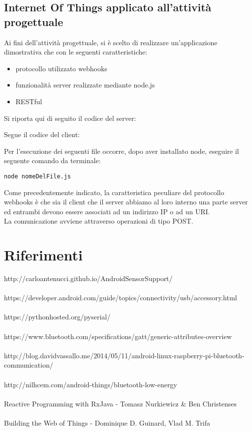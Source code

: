 \documentclass{article}
\begin{document}
\subsection{Internet Of Things applicato all'attività progettuale}
Ai fini dell'attività progettuale, si è scelto di realizzare un'applicazione dimostrativa che con le seguenti caratteristiche:
\begin{itemize}
    \item protocollo utilizzato webhooks
    \item funzionalità server realizzate mediante node.js
    \item RESTful
\end{itemize}
Si riporta qui di seguito il codice del server:

Segue il codice del client:

Per l'esecuzione dei seguenti file occorre, dopo aver installato node, eseguire il seguente comando da terminale:
\begin{lstlisting}
node nomeDelFile.js
\end{lstlisting}
Come precedentemente indicato, la caratteristica peculiare del protocollo webhooks è che sia il client che il server abbiamo al loro interno una parte server ed entrambi devono essere associati ad un indirizzo IP o ad un URI.\\
La comunicazione avviene attraverso operazioni di tipo POST. 
\newpage
\section{Riferimenti}
http://carloantenucci.github.io/AndroidSensorSupport/\\\\
https://developer.android.com/guide/topics/connectivity/usb/accessory.html\\\\
https://pythonhosted.org/pyserial/\\\\
https://www.bluetooth.com/specifications/gatt/generic-attributes-overview\\\\
http://blog.davidvassallo.me/2014/05/11/android-linux-raspberry-pi-bluetooth-communication/\\\\
http://nilhcem.com/android-things/bluetooth-low-energy
\\\\
Reactive Programming with RxJava - Tomasz Nurkiewicz & Ben Christenses
\\\\
Building the Web of Things - Dominique D. Guinard, Vlad M. Trifa
\end{document}
